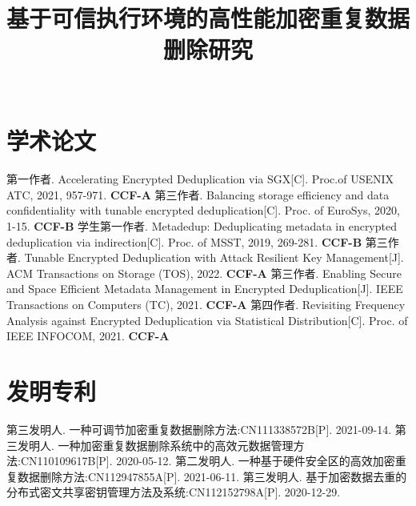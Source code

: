 \documentclass[master]{thesis-uestc}
\title{基于可信执行环境的高性能加密重复数据删除研究}{High-Performance Encrypted Data Deduplication System Based on Trusted Execution Environment}
\author{$\quad$}{$\quad$}
\begin{document}
\makecover
\originalitydeclaration



\thesistableofcontents
\thesisglossarylist







\thesisacknowledgement
% 


\thesisappendix


\begin{thesistheaccomplish}
    \section{学术论文}
     第一作者. Accelerating Encrypted Deduplication via SGX[C]. Proc.of USENIX ATC, 2021, 957-971. \textbf{CCF-A}
     第三作者. Balancing storage efficiency and data confidentiality with tunable encrypted deduplication[C]. Proc. of EuroSys, 2020, 1-15. \textbf{CCF-B}
     学生第一作者. Metadedup: Deduplicating metadata in encrypted deduplication via indirection[C]. Proc. of MSST, 2019, 269-281. \textbf{CCF-B}
     第三作者. Tunable Encrypted Deduplication with Attack Resilient Key Management[J]. ACM Transactions on Storage (TOS), 2022. \textbf{CCF-A}
     第三作者. Enabling Secure and Space Efficient Metadata Management in Encrypted Deduplication[J]. IEEE Transactions on Computers (TC), 2021. \textbf{CCF-A}
     第四作者. Revisiting Frequency Analysis against Encrypted Deduplication via Statistical Distribution[C]. Proc. of IEEE INFOCOM, 2021. \textbf{CCF-A}
    \section{发明专利}
     第三发明人. 一种可调节加密重复数据删除方法:CN111338572B[P]. 2021-09-14.
     第三发明人. 一种加密重复数据删除系统中的高效元数据管理方法:CN110109617B[P]. 2020-05-12.
     第二发明人. 一种基于硬件安全区的高效加密重复数据删除方法:CN112947855A[P]. 2021-06-11.
     第三发明人. 基于加密数据去重的分布式密文共享密钥管理方法及系统:CN112152798A[P]. 2020-12-29.
\end{thesistheaccomplish}
\end{document}
